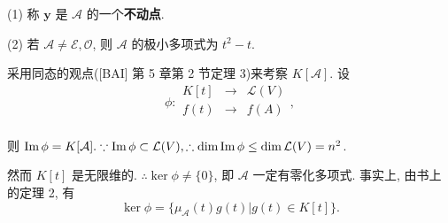 \documentclass{ctexart}
\begin{document}
\begin{note}
    (1) 称 $\boldsymbol{y}$ 是 $\mathcal{A}$ 的一个\textbf{不动点}.

    (2) 若 $\mathcal{A}\neq\mathcal{E},\mathcal{O}$, 则 $\mathcal{A}$ 的极小多项式为 $t^2-t$.
\end{note}
采用同态的观点([BAI] 第 5 章第 2 节定理 3)来考察 $K[\mathcal{A}]$. 设
\[\phi:\begin{array}{rcl}
    K[t] & \to & \mathcal{L}(V) \\
    f(t) & \to & f(A) \\
\end{array},\]

则 $\operatorname{Im} \phi=K[\mathcal{A}].\because\operatorname{Im} \phi\subset\mathcal{L}(V),\therefore\dim\operatorname{Im} \phi\leq\dim\mathcal{L}(V)=n^2$.

然而 $K[t]$ 是无限维的. $\therefore\ker\phi\neq\{0\}$, 即 $\mathcal{A}$ 一定有零化多项式. 事实上, 由书上的定理 2, 有
\[\ker\phi=\{\mu_\mathcal{A}(t)g(t)|g(t)\in K[t]\}.\]
\end{document}
